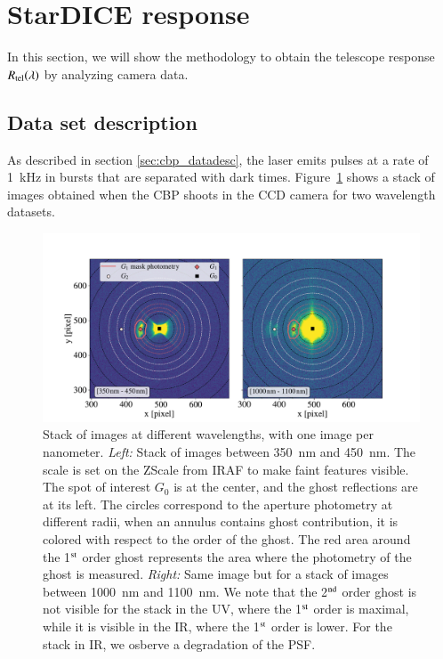 \section{StarDICE response}
\label{sec:rsd}

In this section, we will show the methodology to obtain the \SD telescope response $R_{\mathrm{tel}}(\lambda)$ by analyzing \SD camera data.

\subsection{Data set description}
\label{sec:sd_datadesc}

As described in section \ref{sec:cbp_datadesc}, the laser emits pulses at a rate of \SI{1}{\kilo\hertz} in bursts that are separated with dark times. Figure~\ref{fig:ghost_contrast} shows a stack of images obtained when the CBP shoots in the \SD CCD camera for two wavelength datasets. 

\begin{figure}[h]
    \centering
    \includegraphics[width=\columnwidth]{fig/ghost_contrast.pdf}
    \caption{Stack of images at different wavelengths, with one image per nanometer. \textit{Left:} Stack of images between \SI{350}{\nano\meter} and \SI{450}{\nano\meter}. The scale is set on the ZScale from IRAF to make faint features visible. The spot of interest $G_0$ is at the center, and the ghost reflections are at its left. The circles correspond to the aperture photometry at different radii, when an annulus contains ghost contribution, it is colored with respect to the order of the ghost. The red area around the 1$\textsuperscript{st}$ order ghost represents the area where the photometry of the ghost is measured. \textit{Right:} Same image but for a stack of images between \SI{1000}{\nano\meter} and \SI{1100}{\nano\meter}. We note that the 2$\textsuperscript{nd}$ order ghost is not visible for the stack in the UV, where the 1$\textsuperscript{st}$ order is maximal, while it is visible in the IR, where the 1$\textsuperscript{st}$ order is lower. For the stack in IR, we osberve a degradation of the \SD PSF.}
    \label{fig:ghost_contrast}
\end{figure}

